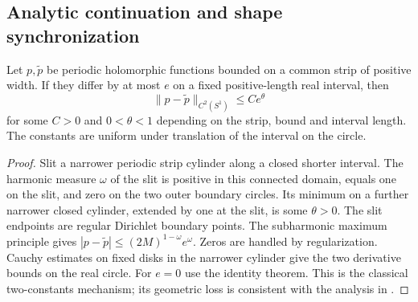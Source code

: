 \subsection{Analytic continuation and shape synchronization}
\begin{lemma}\label{lem:continuation}
Let $p,\widetilde p$ be periodic holomorphic functions bounded on a
common strip of positive width. If they differ by at most $e$ on a
fixed positive-length real interval, then
\[
             \|p-\widetilde p\|_{C^2(S^1)}\le Ce^\theta
\]
for some $C>0$ and $0<\theta<1$ depending on the strip, bound and
interval length. The constants are uniform under translation of the
interval on the circle.
\end{lemma}
\begin{proof}
Slit a narrower periodic strip cylinder along a closed shorter interval.
The harmonic measure $\omega$ of the slit is positive in this connected
domain, equals one on the slit, and zero on the two outer boundary
circles. Its minimum on a further narrower closed cylinder, extended
by one at the slit, is some $\theta>0$. The slit endpoints are regular
Dirichlet boundary points. The subharmonic maximum principle gives
$|p-\widetilde p|\le(2M)^{1-\omega}e^\omega$. Zeros are handled by
regularization. Cauchy estimates on fixed disks in the narrower cylinder
give the two derivative bounds on the real circle. For $e=0$ use the
identity theorem. This is the classical two-constants mechanism; its
geometric loss is consistent with the analysis in \cite{Trefethen}.
\end{proof}

